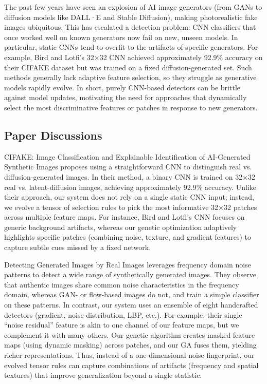 \documentclass[runningheads]{llncs}
\begin{document}
The past few years have seen an explosion of AI image generators (from GANs to diffusion models like DALL·E and Stable Diffusion), making photorealistic fake images ubiquitous. This has escalated a detection problem: CNN classifiers that once worked well on known generators now fail on new, unseen models. In particular, static CNNs tend to overfit to the artifacts of specific generators. For example, Bird and Lotfi's 32×32 CNN achieved approximately 92.9\% accuracy on their CIFAKE dataset but was trained on a fixed diffusion-generated set. Such methods generally lack adaptive feature selection, so they struggle as generative models rapidly evolve. In short, purely CNN-based detectors can be brittle against model updates, motivating the need for approaches that dynamically select the most discriminative features or patches in response to new generators.

\subsection{Paper Discussions}

CIFAKE: Image Classification and Explainable Identification of AI-Generated Synthetic Images \cite{bird2023cifake} proposes using a straightforward CNN to distinguish real vs. diffusion-generated images. In their method, a binary CNN is trained on 32×32 real vs. latent-diffusion images, achieving approximately 92.9\% accuracy. Unlike their approach, our system does not rely on a single static CNN input; instead, we evolve a tensor of selection rules to pick the most informative 32×32 patches across multiple feature maps. For instance, Bird and Lotfi's CNN focuses on generic background artifacts, whereas our genetic optimization adaptively highlights specific patches (combining noise, texture, and gradient features) to capture subtle cues missed by a fixed network.

Detecting Generated Images by Real Images \cite{liu2022detecting} leverages frequency domain noise patterns to detect a wide range of synthetically generated images. They observe that authentic images share common noise characteristics in the frequency domain, whereas GAN- or flow-based images do not, and train a simple classifier on these patterns. In contrast, our system uses an ensemble of eight handcrafted detectors (gradient, noise distribution, LBP, etc.). For example, their single ``noise residual'' feature is akin to one channel of our feature maps, but we complement it with many others. Our genetic algorithm creates masked feature maps (using dynamic masking) across patches, and our GA fuses them, yielding richer representations. Thus, instead of a one-dimensional noise fingerprint, our evolved tensor rules can capture combinations of artifacts (frequency and spatial textures) that improve generalization beyond a single statistic.
\end{document}
